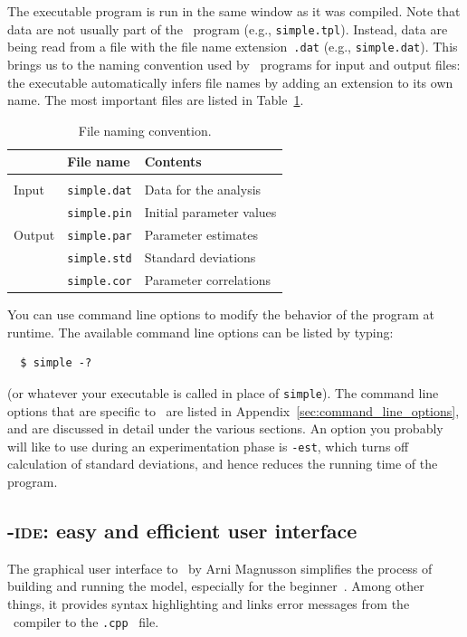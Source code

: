 \documentclass{admbmanual}
\begin{document}
The executable program is run in the same window as it was compiled. Note that data
are not usually part of the \scAB\ program (e.g., \texttt{simple.tpl}). Instead, data are being read from a file with
the file name extension~\texttt{.dat} (e.g., \texttt{simple.dat}). This brings us to the naming convention used by \scAB\ programs for
input and output files: the executable automatically infers file names by adding an extension to its own
name. The most important files are listed in Table~\ref{tab:important-files}.
\begin{table}[h]
\begin{center}
\begin{tabular}{@{\vrule height 12pt depth 6pt width0pt} l l l }
\hline
& \textbf{File name} & \textbf{Contents} \\ \hline\\[-17pt]
Input & \texttt{simple.dat} & Data for the analysis \\
& \texttt{simple.pin} & Initial parameter values \\ \hline
Output & \texttt{simple.par} & Parameter estimates \\
& \texttt{simple.std} & Standard deviations \\
& \texttt{simple.cor} & Parameter correlations\\
\hline
\end{tabular}
\end{center}
\caption{File naming convention.}
\label{tab:important-files}
\end{table}
You can use command line options to modify the behavior of the program at runtime. The available command line options can be
listed by typing:
\begin{lstlisting}
  $ simple -?
\end{lstlisting}
(or whatever your executable is called in place of \texttt{simple}). The command line options that
are specific to \scAR\ are listed in Appendix~\ref{sec:command_line_options}, and are discussed in detail under the various sections. An
option you probably will like to use during an experimentation phase is \texttt{-est}, which turns off
calculation of standard deviations, and hence reduces the running time of the program.


\subsection{\scAB-\textsc{ide}: easy and efficient user interface}

The graphical user interface to \scAB\ by Arni Magnusson simplifies the process
of building and running the model, especially for the beginner~\cite{admb_news_july09}. Among other things, it provides syntax highlighting
and links error messages from the \cplus\ compiler to the \texttt{.cpp}~ file.
\end{document}
